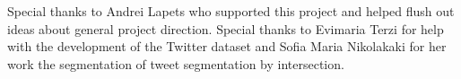 \documentclass[twocolumn,10pt]{asme2ej}
\begin{document}
\begin{acknowledgment}
Special thanks to Andrei Lapets who supported this project and helped flush out ideas about general project direction. Special thanks to Evimaria Terzi for help with the development of the Twitter dataset and Sofia Maria Nikolakaki for her work the segmentation of tweet segmentation by intersection.
\end{acknowledgment}
\end{document}
